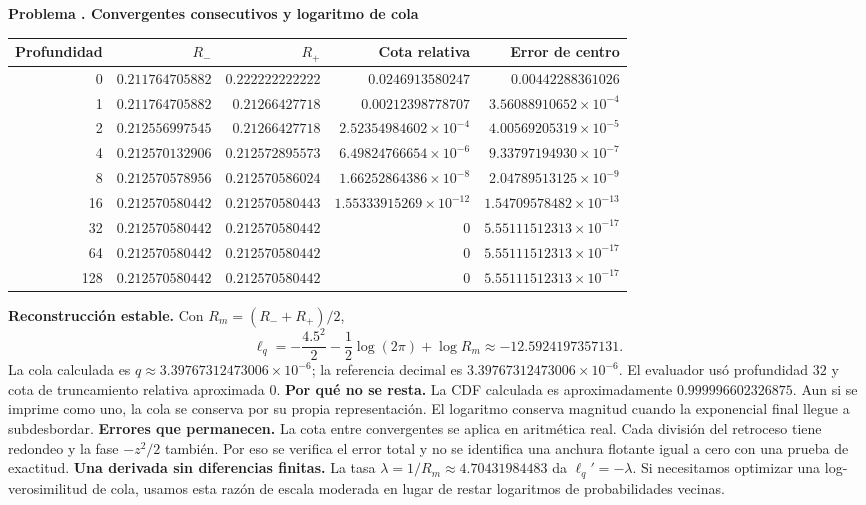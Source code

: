\documentclass[11pt,a4paper]{article}
\theoremstyle{definition}
\newcounter{problema}
\newenvironment{resuelto}[1]{\refstepcounter{problema}\par\medskip\Needspace{6\baselineskip}\textbf{Problema \theproblema. #1}\par}{\par\medskip}
\begin{document}
\begin{resuelto}{Convergentes consecutivos y logaritmo de cola}
\begin{center}\small\begin{tabular}{rrrrr}
\toprule
Profundidad&$R_-$&$R_+$&Cota relativa&Error de centro\\
\midrule
0&$0.211764705882$&$0.222222222222$&$0.0246913580247$&$0.00442288361026$\\
1&$0.211764705882$&$0.21266427718$&$0.00212398778707$&$3.56088910652\times10^{-4}$\\
2&$0.212556997545$&$0.21266427718$&$2.52354984602\times10^{-4}$&$4.00569205319\times10^{-5}$\\
4&$0.212570132906$&$0.212572895573$&$6.49824766654\times10^{-6}$&$9.33797194930\times10^{-7}$\\
8&$0.212570578956$&$0.212570586024$&$1.66252864386\times10^{-8}$&$2.04789513125\times10^{-9}$\\
16&$0.212570580442$&$0.212570580443$&$1.55333915269\times10^{-12}$&$1.54709578482\times10^{-13}$\\
32&$0.212570580442$&$0.212570580442$&$0$&$5.55111512313\times10^{-17}$\\
64&$0.212570580442$&$0.212570580442$&$0$&$5.55111512313\times10^{-17}$\\
128&$0.212570580442$&$0.212570580442$&$0$&$5.55111512313\times10^{-17}$\\
\bottomrule\end{tabular}\end{center}
\textbf{Reconstrucción estable.} Con $R_m=(R_-+R_+)/2$,
\[
\ell_q=-\frac{4.5^2}{2}-\frac12\log(2\pi)+\log R_m\approx-12.5924197357131.
\]
La cola calculada es $q\approx3.39767312473006\times10^{-6}$; la referencia decimal es $3.39767312473006\times10^{-6}$. El evaluador usó profundidad $32$ y cota de truncamiento relativa aproximada $0$.
\textbf{Por qué no se resta.} La CDF calculada es aproximadamente $0.999996602326875$. Aun si se imprime como uno, la cola se conserva por su propia representación. El logaritmo conserva magnitud cuando la exponencial final llegue a subdesbordar.
\textbf{Errores que permanecen.} La cota entre convergentes se aplica en aritmética real. Cada división del retroceso tiene redondeo y la fase $-z^2/2$ también. Por eso se verifica el error total y no se identifica una anchura flotante igual a cero con una prueba de exactitud.
\textbf{Una derivada sin diferencias finitas.} La tasa $\lambda=1/R_m\approx4.70431984483$ da $\ell_q\prime=-\lambda$. Si necesitamos optimizar una log-verosimilitud de cola, usamos esta razón de escala moderada en lugar de restar logaritmos de probabilidades vecinas.
\end{resuelto}
\end{document}
